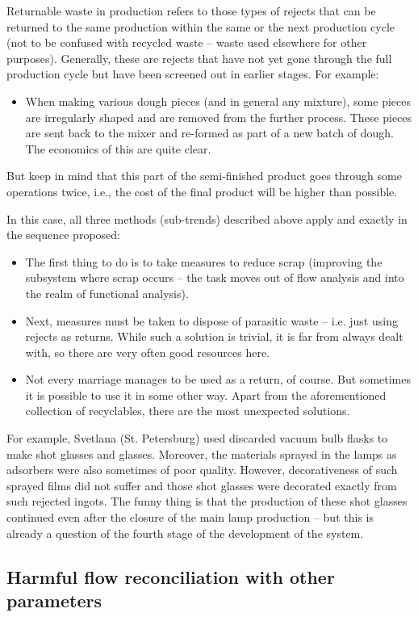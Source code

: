 \documentclass[a4paper,11pt]{article}
\begin{document}
Returnable waste in production refers to those types of rejects that can be
returned to the same production within the same or the next production cycle
(not to be confused with recycled waste -- waste used elsewhere for other
purposes). Generally, these are rejects that have not yet gone through the
full production cycle but have been screened out in earlier stages. For
example:
\begin{itemize}
\item When making various dough pieces (and in general any mixture), some
  pieces are irregularly shaped and are removed from the further process.
  These pieces are sent back to the mixer and re-formed as part of a new batch
  of dough. The economics of this are quite clear.
\end{itemize}
But keep in mind that this part of the semi-finished product goes through some
operations twice, i.e., the cost of the final product will be higher than
possible.

In this case, all three methods (sub-trends) described above apply and exactly
in the sequence proposed:
\begin{itemize}
\item The first thing to do is to take measures to reduce scrap (improving the
  subsystem where scrap occurs -- the task moves out of flow analysis and into
  the realm of functional analysis).
\item Next, measures must be taken to dispose of parasitic waste -- i.e. just
  using rejects as returns. While such a solution is trivial, it is far from
  always dealt with, so there are very often good resources here.
\item Not every marriage manages to be used as a return, of course. But
  sometimes it is possible to use it in some other way. Apart from the
  aforementioned collection of recyclables, there are the most unexpected
  solutions.
\end{itemize}
For example, Svetlana (St. Petersburg) used discarded vacuum bulb flasks to
make shot glasses and glasses. Moreover, the materials sprayed in the lamps as
adsorbers were also sometimes of poor quality. However, decorativeness of such
sprayed films did not suffer and those shot glasses were decorated exactly
from such rejected ingots. The funny thing is that the production of these
shot glasses continued even after the closure of the main lamp production --
but this is already a question of the fourth stage of the development of the
system.

\subsection{Harmful flow reconciliation with other parameters}
\end{document}
